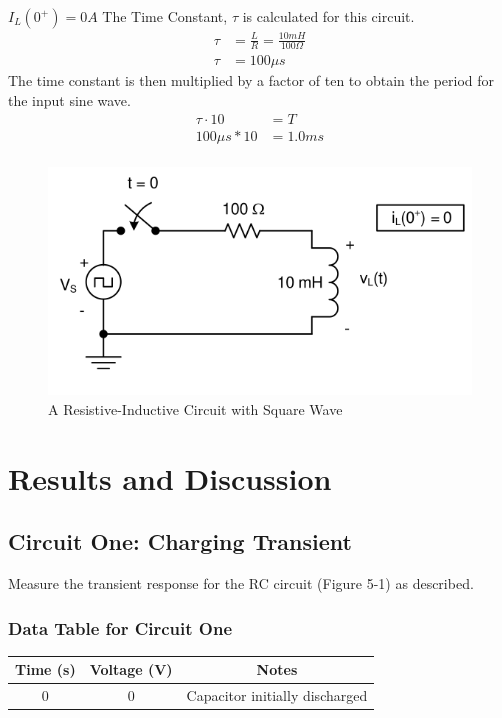 \documentclass[12pt]{article}
\begin{document}
$I_L(0^+) = 0A$
The Time Constant, $\tau$ is calculated for this circuit.
\begin{align*}
	\tau & = \frac{L}{R} = \frac{10mH}{100\Omega} \\
	\tau & = 100\mu s
\end{align*}
The time constant is then multiplied by a factor of ten to obtain the period for
the input sine wave.
\begin{align*}
	\tau \cdot 10 & = T      \\
	100\mu s * 10 & = 1.0 ms \\
\end{align*}
\begin{figure}[H]
	\centering
	\includegraphics[width=14cm]{e5_5}
	\caption{A Resistive-Inductive Circuit with Square Wave}
\end{figure}
\section{Results and Discussion}
\subsection{Circuit One: Charging Transient}
Measure the transient response for the RC circuit (Figure 5-1) as described.

\subsubsection{Data Table for Circuit One}
\begin{tabular}{ccc}
	\toprule
	Time (s) & Voltage (V) & Notes                          \\
	\midrule
	0        & 0           & Capacitor initially discharged \\
	\bottomrule
\end{tabular}
\end{document}
